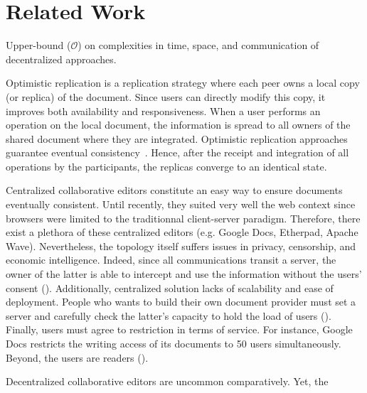 \section{Related Work}
\label{sec:relatedwork}

\begin{table*}
  \centering
  
  \caption{\label{table:complexities}Upper-bound ($\mathcal{O}$) on complexities in time, space, and communication of decentralized approaches.}
\end{table*}

\begin{asparadesc}
\item[Optimistic replication] is a replication strategy where each peer owns a
  local copy (or replica) of the document. Since users can directly modify this
  copy, it improves both availability and responsiveness. When a user performs
  an operation on the local document, the information is spread to all owners of
  the shared document where they are integrated. Optimistic replication
  approaches guarantee eventual consistency~\cite{bailis2013eventual}. Hence,
  after the receipt and integration of all operations by the participants, the
  replicas converge to an identical state.
\item[Centralized] collaborative editors constitute an easy way to ensure
  documents eventually consistent. Until recently, they suited very well the web
  context since browsers were limited to the traditionnal client-server
  paradigm. Therefore, there exist a plethora of these centralized editors
  (e.g. Google Docs, Etherpad, Apache Wave).  Nevertheless, the topology itself
  suffers issues in privacy, censorship, and economic intelligence.  Indeed,
  since all communications transit a server, the owner of the latter is able to
  intercept and use the information without the users' consent ().
  Additionally, centralized solution lacks of scalability and ease of
  deployment. People who wants to build their own document provider must set a
  server and carefully check the latter's capacity to hold the load of users
  ().  Finally, users must agree to restriction in terms of service.
  For instance, Google Docs restricts the writing access of its documents to 50
  users simultaneously. Beyond, the users are readers (). 
\item[Decentralized] collaborative editors are uncommon comparatively. Yet, the

\end{asparadesc}
